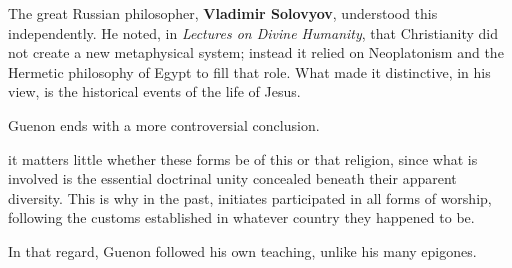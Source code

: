 The great Russian philosopher, \textbf{Vladimir Solovyov}, understood this independently. He noted, in \emph{Lectures on Divine Humanity}, that Christianity did not create a new metaphysical system; instead it relied on Neoplatonism and the Hermetic philosophy of Egypt to fill that role. What made it distinctive, in his view, is the historical events of the life of Jesus.

Guenon ends with a more controversial conclusion.

\begin{quotex}
it matters little whether these forms be of this or that religion, since what is involved is the essential doctrinal unity concealed beneath their apparent diversity. This is why in the past, initiates participated in all forms of worship, following the customs established in whatever country they happened to be.
\end{quotex}


In that regard, Guenon followed his own teaching, unlike his many epigones.



